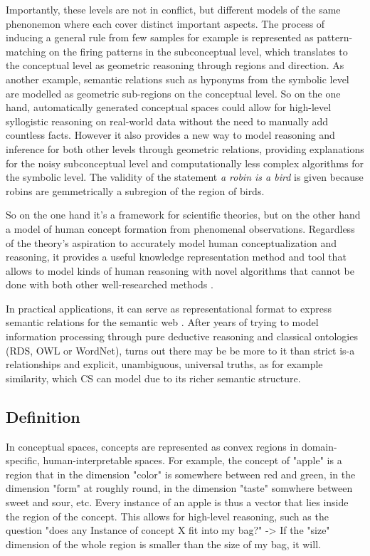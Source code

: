Importantly, these levels are not in conflict, but different models of the same phenonemon where each cover distinct important aspects. The process of inducing a general rule from few samples for example is represented as pattern-matching on the firing patterns in the subconceptual level, which translates to the conceptual level as geometric reasoning through regions and direction. As another example, semantic relations such as hyponyms from the symbolic level are modelled as geometric sub-regions on the conceptual level. So on the one hand, automatically generated conceptual spaces could allow for high-level syllogistic reasoning on real-world data without the need to manually add countless facts. However it also provides a new way to model reasoning and inference for both other levels through geometric relations, providing explanations for the noisy subconceptual level and computationally less complex algorithms for the symbolic level. The validity of the statement \textit{a robin is a bird} is given because robins are gemmetrically a subregion of the region of birds.

So on the one hand it's a framework for scientific theories, but on the other hand a model of human concept formation from phenomenal observations. Regardless of the theory's aspiration to accurately model human conceptualization and reasoning, it provides a useful knowledge representation method and tool that allows to model kinds of human reasoning with novel algorithms that cannot be done with both other well-researched methods \cite[Sec.~6.7]{Gardenfors2000a}. 

In practical applications, it can serve as representational format to express semantic relations for the semantic web \cite{Gardenfors2004}. After years of trying to model information processing through pure deductive reasoning and classical ontologies (\eg RDS, OWL or WordNet), turns out there may be be more to it than strict is-a relationships and explicit, unambiguous, universal truths, as for example similarity, which CS can model due to its richer semantic structure. 

\subsection*{Definition}


In conceptual spaces, concepts are represented as convex regions in domain-specific, human-interpretable spaces. For example, the concept of "apple" is a region that in the dimension "color" is somewhere between red and green, in the dimension "form" at roughly round, in the dimension "taste" somwhere between sweet and sour, etc. Every instance of an apple is thus a vector that lies inside the region of the concept. This allows for high-level reasoning, such as the question "does any Instance of concept X fit into my bag?" -> If the "size" dimension of the whole region is smaller than the size of my bag, it will.

